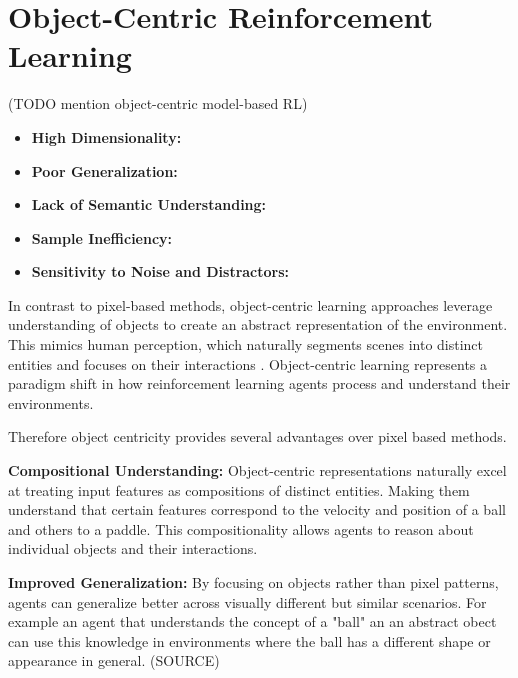 \documentclass[
	english,
	ruledheaders=section,
	class=report,
	thesis={type=master},
	accentcolor=9c,
	custommargins=true,
	marginpar=false,
	parskip=half-,
	fontsize=11pt,
]{tudapub}
\begin{document}




\section{Object-Centric Reinforcement Learning}
\label{sec:object_centric_rl}
(TODO mention object-centric model-based RL)

\begin{itemize}
	\item \textbf{High Dimensionality:} 
	\item \textbf{Poor Generalization:} 
	\item \textbf{Lack of Semantic Understanding:} 
	\item \textbf{Sample Inefficiency:} 
	\item \textbf{Sensitivity to Noise and Distractors:} 
\end{itemize}



In contrast to pixel-based methods, object-centric learning approaches leverage understanding of objects to create an abstract representation of the environment. This mimics human perception,
 which naturally segments scenes into distinct entities and focuses on their interactions \cite{nanbo2021learningobjectcentricrepresentationsmultiobject}. Object-centric learning represents a paradigm shift in how reinforcement learning agents process and understand their environments.

Therefore object centricity provides several advantages over pixel based methods.

\textbf{Compositional Understanding:} Object-centric representations naturally excel at treating input features as compositions of distinct entities. Making them understand that certain features
correspond to the velocity and position of a ball and others to a paddle. This compositionality allows agents to reason about individual objects and their interactions.

\textbf{Improved Generalization:} By focusing on objects rather than pixel patterns, agents can generalize better across visually different but similar scenarios. For example an agent that
 understands the concept of a "ball" an an abstract obect can use this knowledge in environments where the ball has a different shape or appearance in general. (SOURCE)
\end{document}
